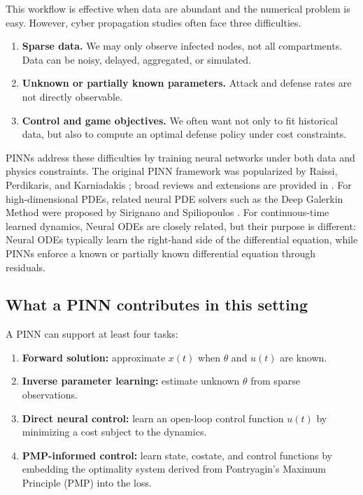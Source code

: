\documentclass[11pt,a4paper]{article}
\begin{document}
This workflow is effective when data are abundant and the numerical problem is easy. However, cyber propagation studies often face three difficulties.
\begin{enumerate}[leftmargin=2em]
    \item \textbf{Sparse data.} We may only observe infected nodes, not all compartments. Data can be noisy, delayed, aggregated, or simulated.
    \item \textbf{Unknown or partially known parameters.} Attack and defense rates are not directly observable.
    \item \textbf{Control and game objectives.} We often want not only to fit historical data, but also to compute an optimal defense policy under cost constraints.
\end{enumerate}

PINNs address these difficulties by training neural networks under both data and physics constraints. The original PINN framework was popularized by Raissi, Perdikaris, and Karniadakis \cite{raissi2019pinn}; broad reviews and extensions are provided in \cite{karniadakis2021pinnreview,lu2021deepxde}. For high-dimensional PDEs, related neural PDE solvers such as the Deep Galerkin Method were proposed by Sirignano and Spiliopoulos \cite{sirignano2018dgm}. For continuous-time learned dynamics, Neural ODEs \cite{chen2018neuralode} are closely related, but their purpose is different: Neural ODEs typically learn the right-hand side of the differential equation, while PINNs enforce a known or partially known differential equation through residuals.

\subsection{What a PINN contributes in this setting}
A PINN can support at least four tasks:
\begin{enumerate}[leftmargin=2em]
    \item \textbf{Forward solution:} approximate $x(t)$ when $\theta$ and $u(t)$ are known.
    \item \textbf{Inverse parameter learning:} estimate unknown $\theta$ from sparse observations.
    \item \textbf{Direct neural control:} learn an open-loop control function $u(t)$ by minimizing a cost subject to the dynamics.
    \item \textbf{PMP-informed control:} learn state, costate, and control functions by embedding the optimality system derived from Pontryagin's Maximum Principle (PMP) into the loss.
\end{enumerate}
\end{document}
